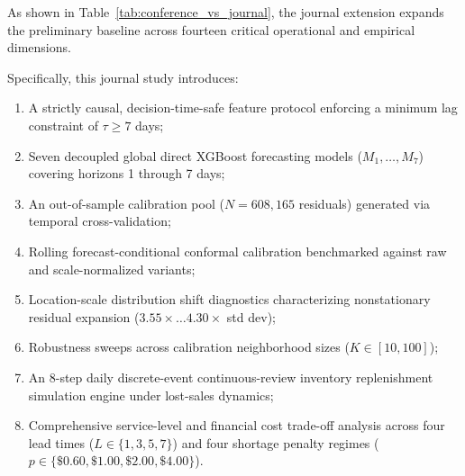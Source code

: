 \documentclass[11pt,a4paper]{article}
\begin{document}
As shown in Table~\ref{tab:conference_vs_journal}, the journal extension expands the preliminary baseline across fourteen critical operational and empirical dimensions.

Specifically, this journal study introduces:
\begin{enumerate}
    \item A strictly causal, decision-time-safe feature protocol enforcing a minimum lag constraint of $\tau \ge 7$ days;
    \item Seven decoupled global direct XGBoost forecasting models ($M_1, \dots, M_7$) covering horizons 1 through 7 days;
    \item An out-of-sample calibration pool ($N = 608,165$ residuals) generated via temporal cross-validation;
    \item Rolling forecast-conditional conformal calibration benchmarked against raw and scale-normalized variants;
    \item Location-scale distribution shift diagnostics characterizing nonstationary residual expansion ($3.55\times\dots4.30\times$ std dev);
    \item Robustness sweeps across calibration neighborhood sizes ($K \in [10, 100]$);
    \item An 8-step daily discrete-event continuous-review inventory replenishment simulation engine under lost-sales dynamics;
    \item Comprehensive service-level and financial cost trade-off analysis across four lead times ($L \in \{1, 3, 5, 7\}$) and four shortage penalty regimes ($p \in \{\$0.60, \$1.00, \$2.00, \$4.00\}$).
\end{enumerate}
\end{document}

